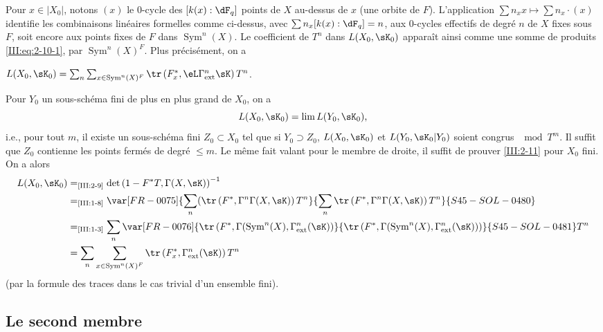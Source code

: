Pour $x\in |X_0|$, notons $(x)$ le $0$-cycle des $[k(x):\dF_q]$ points de $X$ 
au-dessus de $x$ (une orbite de $F$). L'application 
$\sum n_x x\mapsto \sum n_x\cdot (x)$ identifie les combinaisons linéaires 
formelles comme ci-dessus, avec $\sum n_x [k(x):\dF_q]=n$, aux $0$-cycles 
effectifs de degré $n$ de $X$ fixes sous $F$, soit encore aux points fixes de 
$F$ dans $\operatorname{Sym}^n(X)$. Le coefficient de $T^n$ dans $L(X_0,\sK_0)$ 
apparaît ainsi comme une somme de produits \eqref{III:eq:2-10-1},  
par $\operatorname{Sym}^n(X)^F$. Plus précisément, on a 





\begin{lemma_}\label{III:2-11}
 $L(X_0,\sK_0) = \sum_n \sum_{x\in\operatorname{Sym}^n(X)^F} \tr\left(F_x^*,\eL\Gamma_\textnormal{ext}^n \sK\right) T^n$.
\end{lemma_}

Pour $Y_0$ un sous-schéma fini de plus en plus grand de $X_0$, on a 
\[
  L(X_0,\sK_0) = \lim L(Y_0,\sK_0) \text{,}
\]
i.e., pour tout $m$, il existe un sous-schéma fini $Z_0\subset X_0$ tel que 
si $Y_0\supset Z_0$, $L(X_0,\sK_0)$ et $L(Y_0,\sK_0|Y_0)$ soient congrus 
$\mod T^m$. 
Il suffit que $Z_0$ contienne les points fermés de degré $\leqslant m$. 
Le même fait valant pour le membre de droite, il suffit de prouver 
\ref{III:2-11} pour $X_0$ fini. On a alors 
\begin{align*}
  L(X_0,\sK_0) 
    &=_\text{\ref{III:2-9}} \det\left(1-F^* T,\Gamma(X,\sK)\right)^{-1} \\
    &=_\text{\ref{III:1-8}} \var[FR-0075]{\sum_n (\tr\left(F^*,\Gamma^n \Gamma(X,\sK)\right) T^n}{\sum_n \tr\left(F^*,\Gamma^n \Gamma(X,\sK)\right) T^n}{S45-SOL-0480} \\
    &=_\text{\ref{III:1-3}} \sum_n \var[FR-0076]{\tr\left(F^*,\Gamma(\operatorname{Sym}^n(X),\Gamma_\text{ext}^n(\sK)\right)}{\tr\left(F^*,\Gamma(\operatorname{Sym}^n(X),\Gamma_\text{ext}^n(\sK))\right)}{S45-SOL-0481} T^n \\
    &= \sum_n \sum_{x\in \operatorname{Sym}^n(X)^F} \tr\left(F_x^*,\Gamma_\text{ext}^n(\sK)\right) T^n
\end{align*}
(par la formule des traces dans le cas trivial d'un ensemble fini). 





\subsection{Le second membre}\label{III:2-12}

